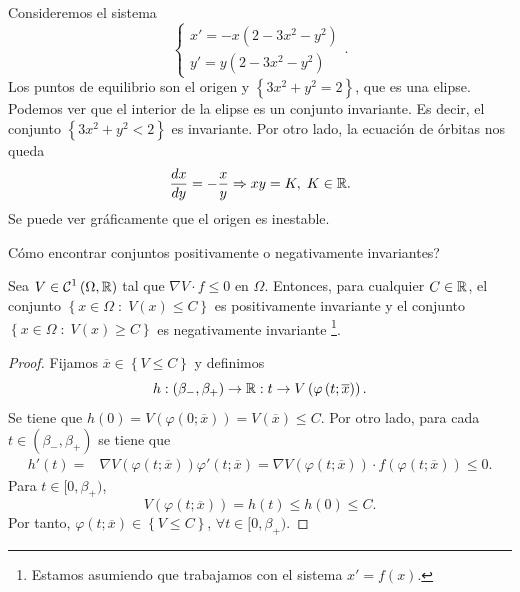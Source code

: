 \begin{eg}[Problema 40]
Consideremos el sistema 
\[
\begin{cases}
x' = - x\left(2-3x^{2}-y^{2}\right)\\
y' = y\left(2 - 3x^{2}-y^{2}\right)
\end{cases}
.\]
Los puntos de equilibrio son el origen y $\displaystyle \left\{ 3x^{2}+y^{2}=2\right\}  $, que es una elipse. Podemos ver que el interior de la elipse es un conjunto invariante. Es decir, el conjunto $\displaystyle \left\{ 3x^{2}+y^{2}< 2\right\}  $ es invariante. Por otro lado, la ecuación de órbitas nos queda
\[\frac{dx}{dy}=-\frac{x}{y} \Rightarrow xy = K, \; K \in \mathbb{R} .\]
Se puede ver gráficamente que el origen es inestable.
\end{eg}
Cómo encontrar conjuntos positivamente o negativamente invariantes?
\begin{prop}
	Sea $\displaystyle V \in \mathcal{C}^{1}\left(\Omega, \mathbb{R}\right) $ tal que $\displaystyle \nabla V \cdot f \leq 0 $ en $\displaystyle \Omega  $. Entonces, para cualquier $\displaystyle C \in \mathbb{R} $, el conjunto $\displaystyle \left\{ x \in \Omega \; : \; V\left(x\right)\leq C\right\}  $ es positivamente invariante y el conjunto $\displaystyle \left\{ x \in \Omega \; : \; V\left(x\right)\geq C\right\}  $ es negativamente invariante \footnote{Estamos asumiendo que trabajamos con el sistema $\displaystyle x' = f\left(x\right) $.}.
\end{prop}
\begin{proof}
	Fijamos $\displaystyle \overline{x}\in \left\{ V \leq C\right\}  $ y definimos 
	\[h : \left(\beta_{-}, \beta_{+ }\right)\to \mathbb{R} : t \to V\left(\varphi\left(t; \overline{x}\right)\right) .\]
Se tiene que $\displaystyle h\left(0\right)=V\left(\varphi\left(0; \overline{x}\right)\right)=V\left(\overline{x}\right)\leq C $. Por otro lado, para cada $\displaystyle t \in \left(\beta_{-}, \beta_{+ }\right) $ se tiene que
\[
\begin{split}
	h'\left(t\right)= & \nabla V\left(\varphi\left(t; \overline{x}\right)\right)\varphi'\left(t; \overline{x}\right) = \nabla V\left(\varphi\left(t; \overline{x}\right)\right) \cdot f\left(\varphi\left(t; \overline{x}\right)\right)\leq 0 .
\end{split}
\]
Para $\displaystyle t \in [0, \beta_{+ }) $, 
\[V\left(\varphi\left(t; \overline{x}\right)\right)=h\left(t\right)\leq h\left(0\right)\leq C .\]
Por tanto, $\displaystyle \varphi\left(t; \overline{x}\right)\in \left\{ V \leq C\right\}  $, $\displaystyle \forall t \in [0, \beta_{+ }) $. 
\end{proof}
